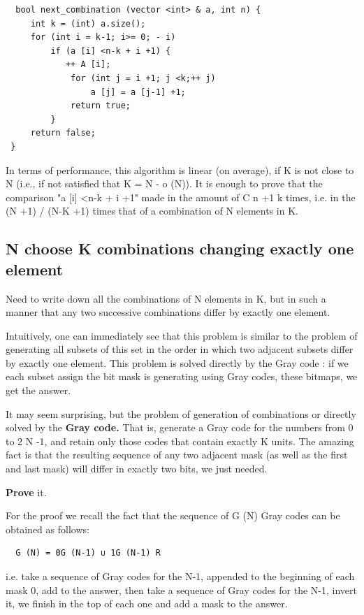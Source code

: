 \begin{verbatim}
  bool next_combination (vector <int> & a, int n) {
     int k = (int) a.size();
     for (int i = k-1; i>= 0; - i)
         if (a [i] <n-k + i +1) {
            ++ A [i];
             for (int j = i +1; j <k;++ j)
                 a [j] = a [j-1] +1;
             return true;
         }
     return false;
 } 
\end{verbatim}
In terms of performance, this algorithm is linear (on average), if K is not close to N (i.e., if not satisfied that K = N - o (N)). It is enough to prove that the comparison "a [i] <n-k + i +1" made ​​in the amount of C n +1 k times, i.e. in the (N +1) / (N-K +1) times that of a combination of N elements in K.

\subsection{N choose K combinations changing exactly one element }
Need to write down all the combinations of N elements in K, but in such a manner that any two successive combinations differ by exactly one element.

Intuitively, one can immediately see that this problem is similar to the problem of generating all subsets of this set in the order in which two adjacent subsets differ by exactly one element. This problem is solved directly by the Gray code : if we each subset assign the bit mask is generating using Gray codes, these bitmaps, we get the answer.

It may seem surprising, but the problem of generation of combinations or directly solved by the \textbf{Gray code.} That is, generate a Gray code for the numbers from 0 to 2 N -1, and retain only those codes that contain exactly K units. The amazing fact is that the resulting sequence of any two adjacent mask (as well as the first and last mask) will differ in exactly two bits, we just needed.

\textbf{Prove} it.

For the proof we recall the fact that the sequence of G (N) Gray codes can be obtained as follows:

\begin{verbatim}
  G (N) = 0G (N-1) ∪ 1G (N-1) R 
\end{verbatim}
i.e. take a sequence of Gray codes for the N-1, appended to the beginning of each mask 0, add to the answer, then take a sequence of Gray codes for the N-1, invert it, we finish in the top of each one and add a mask to the answer.

